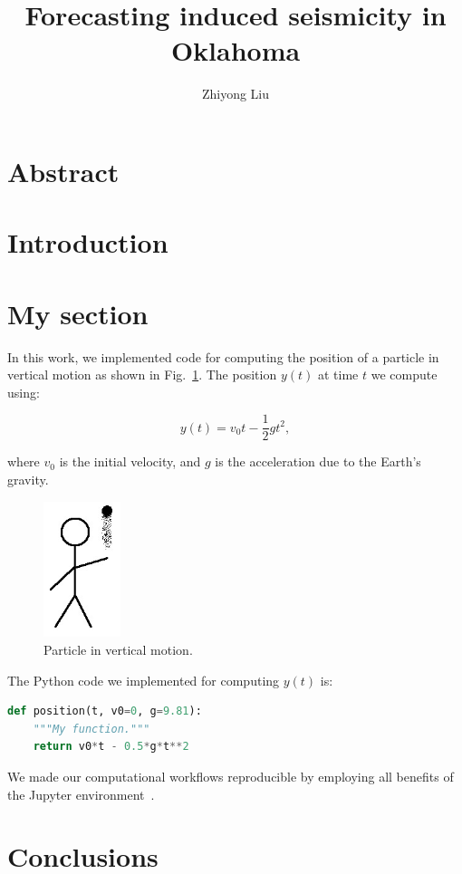 \documentclass[project-plan]{report-template}
\title{Forecasting induced seismicity in Oklahoma}
\author{Zhiyong Liu}
\begin{document}
\maketitlepage  %
\githubrepo  %

\section*{Abstract}
\blindtext  %

\section{Introduction}
\blindtext[2]

\section{My section}
In this work, we implemented code for computing the position of a particle in vertical motion as shown in Fig.~\ref{fig:experiment}. The position $y(t)$ at time $t$ we compute using:

\begin{equation}
    \label{eq:vertical-position}
    y(t) = v_{0}t - \frac{1}{2}gt^{2},
\end{equation}

where $v_{0}$ is the initial velocity, and $g$ is the acceleration due to the Earth's gravity.

\begin{figure}
    \begin{center}
        \includegraphics[width=0.2\textwidth]{experiment.jpg}
    \end{center}
    \caption{\label{fig:experiment} Particle in vertical motion.}
\end{figure}

The Python code we implemented for computing $y(t)$ is:

\begin{lstlisting}[language=Python]
def position(t, v0=0, g=9.81):
    """My function."""
    return v0*t - 0.5*g*t**2
\end{lstlisting}

We made our computational workflows reproducible by employing all benefits of the Jupyter environment~\citep{Beg2021}.

\section*{Conclusions}
\blindtext[2]


\end{document}
